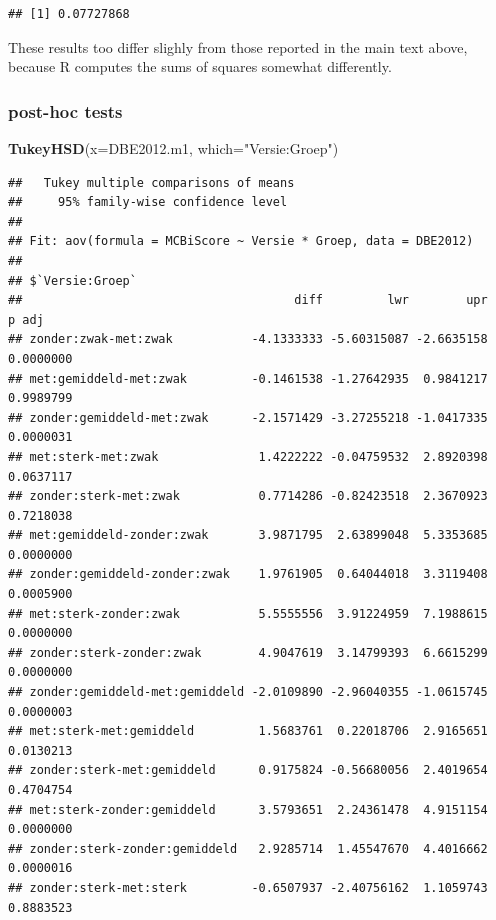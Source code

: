 \documentclass[
]{book}
\newenvironment{Shaded}{\begin{snugshade}}{\end{snugshade}}
\newcommand{\AttributeTok}[1]{\textcolor[rgb]{0.13,0.29,0.53}{#1}}
\newcommand{\FunctionTok}[1]{\textcolor[rgb]{0.13,0.29,0.53}{\textbf{#1}}}
\newcommand{\NormalTok}[1]{#1}
\newcommand{\StringTok}[1]{\textcolor[rgb]{0.31,0.60,0.02}{#1}}
\begin{document}
\begin{verbatim}
## [1] 0.07727868
\end{verbatim}

These results too differ slighly from those reported in the main text above, because R computes the sums of squares somewhat differently.

\hypertarget{post-hoc-tests}{%
\subsubsection{post-hoc tests}\label{post-hoc-tests}}

\begin{Shaded}
\begin{Highlighting}[]
\FunctionTok{TukeyHSD}\NormalTok{(}\AttributeTok{x=}\NormalTok{DBE2012.m1, }\AttributeTok{which=}\StringTok{"Versie:Groep"}\NormalTok{)}
\end{Highlighting}
\end{Shaded}

\begin{verbatim}
##   Tukey multiple comparisons of means
##     95% family-wise confidence level
## 
## Fit: aov(formula = MCBiScore ~ Versie * Groep, data = DBE2012)
## 
## $`Versie:Groep`
##                                      diff         lwr        upr     p adj
## zonder:zwak-met:zwak           -4.1333333 -5.60315087 -2.6635158 0.0000000
## met:gemiddeld-met:zwak         -0.1461538 -1.27642935  0.9841217 0.9989799
## zonder:gemiddeld-met:zwak      -2.1571429 -3.27255218 -1.0417335 0.0000031
## met:sterk-met:zwak              1.4222222 -0.04759532  2.8920398 0.0637117
## zonder:sterk-met:zwak           0.7714286 -0.82423518  2.3670923 0.7218038
## met:gemiddeld-zonder:zwak       3.9871795  2.63899048  5.3353685 0.0000000
## zonder:gemiddeld-zonder:zwak    1.9761905  0.64044018  3.3119408 0.0005900
## met:sterk-zonder:zwak           5.5555556  3.91224959  7.1988615 0.0000000
## zonder:sterk-zonder:zwak        4.9047619  3.14799393  6.6615299 0.0000000
## zonder:gemiddeld-met:gemiddeld -2.0109890 -2.96040355 -1.0615745 0.0000003
## met:sterk-met:gemiddeld         1.5683761  0.22018706  2.9165651 0.0130213
## zonder:sterk-met:gemiddeld      0.9175824 -0.56680056  2.4019654 0.4704754
## met:sterk-zonder:gemiddeld      3.5793651  2.24361478  4.9151154 0.0000000
## zonder:sterk-zonder:gemiddeld   2.9285714  1.45547670  4.4016662 0.0000016
## zonder:sterk-met:sterk         -0.6507937 -2.40756162  1.1059743 0.8883523
\end{verbatim}
\end{document}
